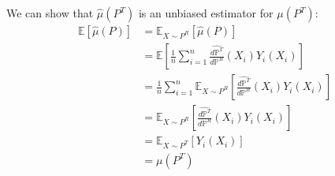 \documentclass{article}
\begin{document}
We can show that $\hat{\mu}(P^T)$ is an unbiased estimator for $\mu(P^T)$:
\begin{align*}
    \mathbb{E}[\hat{\mu}(P)] &= \mathbb{E}_{X \sim P^R}[\hat{\mu}(P)] \\
    &= \mathbb{E}\left[\frac{1}{n} \sum_{i=1}^n \frac{\hat{d \mathbb{P}^T}}{d \mathbb{P}^R}(X_i)Y_i(X_i)\right] \\
    &=\frac{1}{n}\sum_{i=1}^n \mathbb{E}_{X \sim P^R}\left[\frac{\hat{d \mathbb{P}^T}}{d \mathbb{P}^R}(X_i)Y_i(X_i)\right] \\
    &= \mathbb{E}_{X \sim P^R}\left[\frac{\hat{d \mathbb{P}^T}}{d \mathbb{P}^R}(X_i)Y_i(X_i)\right] \\
    &=\mathbb{E}_{X \sim P^T}[Y_i(X_i)] \\
    &= \mu(P^T)
\end{align*}
\end{document}
